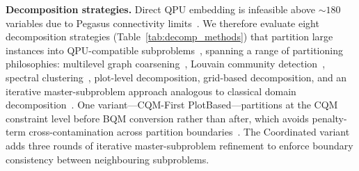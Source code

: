 \documentclass[conference]{IEEEtran}
\begin{document}
\textbf{Decomposition strategies.}
Direct QPU embedding is infeasible above ${\sim}180$ variables due to Pegasus connectivity limits~\cite{zbinden2020embedding, boothby2020next, prxquantum2040322}.
We therefore evaluate eight decomposition strategies (Table~\ref{tab:decomp_methods}) that partition large instances into QPU-compatible subproblems~\cite{bass2021optimizing, booth2017partitioning}, spanning a range of partitioning philosophies: multilevel graph coarsening~\cite{karypis1998fast, hendrickson1995multilevel}, Louvain community detection~\cite{blondel2008fast}, spectral clustering~\cite{vonluxburg2007tutorial, shi2000normalized}, plot-level decomposition, grid-based decomposition, and an iterative master-subproblem approach analogous to classical domain decomposition~\cite{toselli2005domain, geoffrion1972generalized}.
One variant---CQM-First PlotBased---partitions at the CQM constraint level before BQM conversion rather than after, which avoids penalty-term cross-contamination across partition boundaries~\cite{bian2020solving, date2019efficiently}.
The Coordinated variant adds three rounds of iterative master-subproblem refinement to enforce boundary consistency between neighbouring subproblems.

\begin{table}[t]
\centering
\caption{QPU decomposition strategies evaluated.}
\label{tab:decomp_methods}
\footnotesize
\setlength{\tabcolsep}{3pt}
\end{table}
\end{document}

